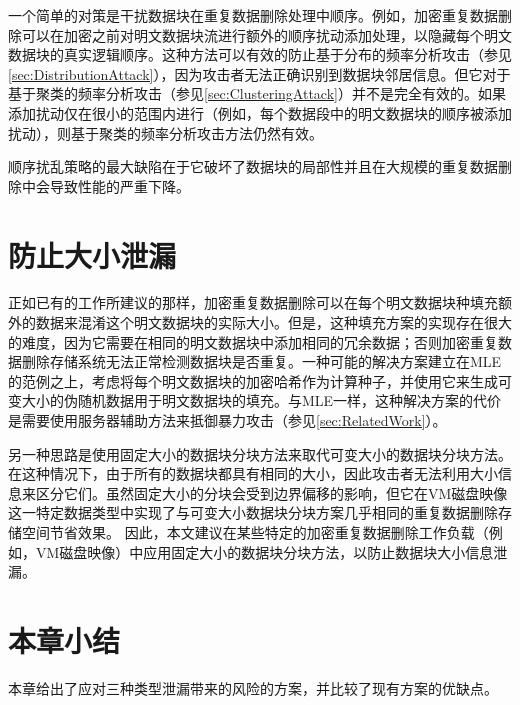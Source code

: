 一个简单的对策是干扰数据块在重复数据删除处理中顺序。例如，加密重复数据删除可以在加密之前对明文数据块流进行额外的顺序扰动添加处理，以隐藏每个明文数据块的真实逻辑顺序。这种方法可以有效的防止基于分布的频率分析攻击（参见\ref{sec:DistributionAttack}），因为攻击者无法正确识别到数据块邻居信息。但它对于基于聚类的频率分析攻击（参见\ref{sec:ClusteringAttack}）并不是完全有效的。如果添加扰动仅在很小的范围内进行（例如，每个数据段中的明文数据块的顺序被添加扰动），则基于聚类的频率分析攻击方法仍然有效。

顺序扰乱策略的最大缺陷在于它破坏了数据块的局部性并且在大规模的重复数据删除中会导致性能的严重下降。

\section{防止大小泄漏}

正如已有的工作所建议的那样，加密重复数据删除可以在每个明文数据块种填充额外的数据来混淆这个明文数据块的实际大小。但是，这种填充方案的实现存在很大的难度，因为它需要在相同的明文数据块中添加相同的冗余数据；否则加密重复数据删除存储系统无法正常检测数据块是否重复。一种可能的解决方案建立在MLE的范例之上，考虑将每个明文数据块的加密哈希作为计算种子，并使用它来生成可变大小的伪随机数据用于明文数据块的填充。与MLE一样，这种解决方案的代价是需要使用服务器辅助方法来抵御暴力攻击（参见\ref{sec:RelatedWork}）。   


另一种思路是使用固定大小的数据块分块方法来取代可变大小的数据块分块方法。在这种情况下，由于所有的数据块都具有相同的大小，因此攻击者无法利用大小信息来区分它们。虽然固定大小的分块会受到边界偏移的影响，但它在VM磁盘映像这一特定数据类型中实现了与可变大小数据块分块方案几乎相同的重复数据删除存储空间节省效果。 因此，本文建议在某些特定的加密重复数据删除工作负载（例如，VM磁盘映像）中应用固定大小的数据块分块方法，以防止数据块大小信息泄漏。

\section{本章小结}

本章给出了应对三种类型泄漏带来的风险的方案，并比较了现有方案的优缺点。
